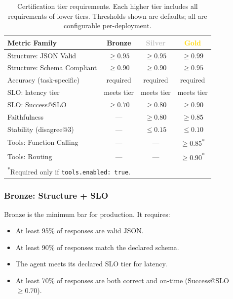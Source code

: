 \documentclass[11pt]{article}
\begin{document}
\begin{table}[t]
\centering
\caption{Certification tier requirements. Each higher tier includes all requirements of lower tiers. Thresholds shown are defaults; all are configurable per-deployment.}
\label{tab:tiers}
\small
\begin{tabular}{lccc}
\toprule
\textbf{Metric Family} & \textcolor{bronze}{\textbf{Bronze}} & \textcolor{silver}{\textbf{Silver}} & \textcolor{gold}{\textbf{Gold}} \\
\midrule
Structure: JSON Valid       & $\geq 0.95$ & $\geq 0.95$ & $\geq 0.99$ \\
Structure: Schema Compliant & $\geq 0.90$ & $\geq 0.90$ & $\geq 0.95$ \\
Accuracy (task-specific)    & required    & required    & required \\
SLO: latency tier           & meets tier  & meets tier  & meets tier \\
SLO: Success@SLO            & $\geq 0.70$ & $\geq 0.80$ & $\geq 0.90$ \\
\midrule
Faithfulness                & ---         & $\geq 0.80$ & $\geq 0.85$ \\
Stability (disagree@3)      & ---         & $\leq 0.15$ & $\leq 0.10$ \\
\midrule
Tools: Function Calling     & ---         & ---         & $\geq 0.85$\textsuperscript{*} \\
Tools: Routing              & ---         & ---         & $\geq 0.90$\textsuperscript{*} \\
\bottomrule
\multicolumn{4}{l}{\footnotesize \textsuperscript{*}Required only if \texttt{tools.enabled: true}.}
\end{tabular}
\end{table}

\subsubsection{\textcolor{bronze}{Bronze}: Structure + SLO}

Bronze is the minimum bar for production. It requires:
\begin{itemize}[leftmargin=12pt]
  \item At least 95\% of responses are valid JSON.
  \item At least 90\% of responses match the declared schema.
  \item The agent meets its declared SLO tier for latency.
  \item At least 70\% of responses are both correct and on-time (Success@SLO $\geq 0.70$).
\end{itemize}
\end{document}
